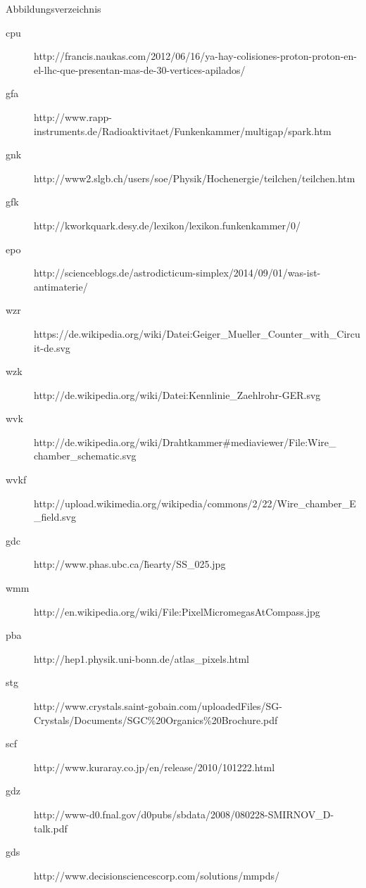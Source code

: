 \documentclass{beamer}
\begin{document}
\begin{frame}{Abbildungsverzeichnis}
\footnotesize
	\begin{adjustwidth}{-5em}{-2em}
	  	\begin{description}
	  		\item[cpu]
		  	http://francis.naukas.com/2012/06/16/ya-hay-colisiones-proton-proton-en-el-lhc-que-presentan-mas-de-30-vertices-apilados/
			\item[gfa]
		  	http://www.rapp-instruments.de/Radioaktivitaet/Funkenkammer/multigap/spark.htm	
		  	\item[gnk]
		  	http://www2.slgb.ch/users/soe/Physik/Hochenergie/teilchen/teilchen.htm  
		  	\item[gfk]
		  	http://kworkquark.desy.de/lexikon/lexikon.funkenkammer/0/
		  	\item[epo]
		  	http://scienceblogs.de/astrodicticum-simplex/2014/09/01/was-ist-antimaterie/
		 	\item[wzr]
		  	https://de.wikipedia.org/wiki/Datei:Geiger\_Mueller\_Counter\_with\_Circuit-de.svg
		  	\item[wzk]
			http://de.wikipedia.org/wiki/Datei:Kennlinie\_Zaehlrohr-GER.svg
			\item[wvk]
		  	http://de.wikipedia.org/wiki/Drahtkammer\#mediaviewer/File:Wire\_ chamber\_schematic.svg
		  	\item[wvkf]
		  	http://upload.wikimedia.org/wikipedia/commons/2/22/Wire\_chamber\_E\_field.svg
		  	\item[gdc]
		  	http://www.phas.ubc.ca/\~hearty/SS\_025.jpg
		  	\item[wmm]
		  	http://en.wikipedia.org/wiki/File:PixelMicromegasAtCompass.jpg
		  	\item[pba]
		  	http://hep1.physik.uni-bonn.de/atlas\_pixels.html
		  	\item[stg]
		  	http://www.crystals.saint-gobain.com/uploadedFiles/SG-Crystals/Documents/SGC\%20Organics\%20Brochure.pdf
		  	\item[scf]
		  	http://www.kuraray.co.jp/en/release/2010/101222.html
			\item[gdz]
		  	http://www-d0.fnal.gov/d0pubs/sbdata/2008/080228-SMIRNOV\_D-talk.pdf
		  	\item[gds]
		  	http://www.decisionsciencescorp.com/solutions/mmpds/
		  	
		\end{description}
	\end{adjustwidth}
\end{frame}
\end{document}
